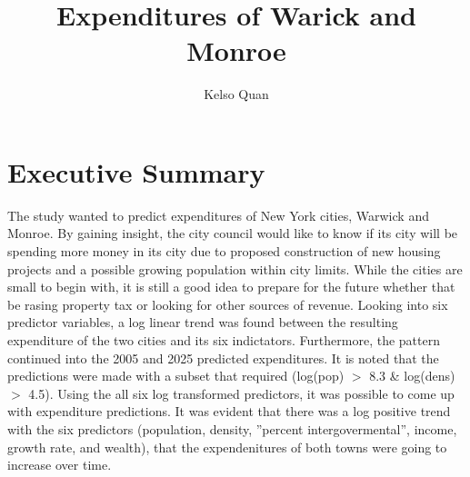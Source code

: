 \documentclass{article}
\title{Expenditures of Warick and Monroe}
\author{Kelso Quan}
\begin{document}
 

\maketitle
\section{Executive Summary}

\qquad The study wanted to predict expenditures of New York cities, Warwick and Monroe. By gaining insight, the city council would like to know if its city will be spending more money in its city due to proposed construction of new housing projects and a possible growing population within city limits. While the cities are small to begin with, it is still a good idea to prepare for the future whether that be rasing property tax or looking for other sources of revenue. Looking into six predictor variables, a log linear trend was found between the resulting expenditure of the two cities and its six indictators. Furthermore, the pattern continued into the 2005 and 2025 predicted expenditures. It is noted that the predictions were made with a subset that required (log(pop) $>$ 8.3 \& log(dens) $>$ 4.5). Using the all six log transformed predictors, it was possible to come up with expenditure predictions. It was evident that there was a log positive trend with the six predictors (population, density, ''percent intergovermental'', income, growth rate, and wealth), that the expendenitures of both towns were going to increase over time. 
\end{document}
